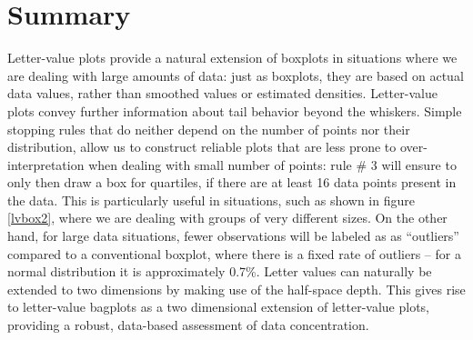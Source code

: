 \documentclass[oneside]{article}
\begin{document}
\section{Summary}
\label{sec:summary}

Letter-value plots provide a natural extension of boxplots in situations where we are dealing with large amounts of data: just as boxplots, they are based on actual data values, rather than smoothed values or estimated densities. Letter-value plots convey further information about tail behavior beyond the whiskers. Simple stopping rules that do neither depend on the number of points nor their distribution, allow us to construct reliable plots that are less prone to over-interpretation when dealing with small number of points: rule \# 3 will ensure to only then draw a box for quartiles, if there are at least 16 data points present in the data. This is particularly useful in situations, such as shown in figure \ref{lvbox2}, where we are dealing with groups of very different sizes. On the other hand, for large data situations, fewer observations will be labeled as  as ``outliers'' 
compared to a conventional boxplot, where there is a fixed rate of outliers -- for a normal distribution it is approximately 0.7\%.
Letter values can naturally be extended to two dimensions by making use of the half-space depth. This gives rise to letter-value bagplots as a two dimensional extension of letter-value plots, providing a robust, data-based assessment of data concentration. 

%
\end{document}
